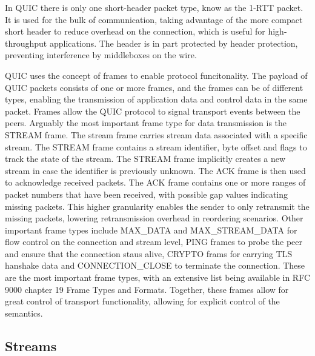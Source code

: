 \documentclass[english, 12pt, a4paper, elec, utf8, a-2b, online]{aaltothesis}
\begin{document}
In QUIC there is only one short-header packet type, know as the 1-RTT packet. It is
used for the bulk of communication, taking advantage of the more compact short
header to reduce overhead on the connection, which is useful for high-throughput
applications. The header is in part protected by header protection, preventing
interference by middleboxes on the wire.

QUIC uses the concept of frames to enable protocol funcitonality. The payload of
QUIC packets consists of one or more frames, and the frames can be of different types,
enabling the transmission of application data and control data in the same packet. Frames
allow the QUIC protocol to signal transport events between the peers. Arguably the most
important frame type for data transmission is the STREAM frame. The stream frame
carries stream data associated with a specific stream. The STREAM frame contains
a stream identifier, byte offset and flags to track the state of the stream. The STREAM
frame implicitly creates a new stream in case the identifier is previously unknown.
The ACK frame is then used to acknowledge received packets. The ACK frame contains
one or more ranges of packet numbers that have been received, with possible gap values
indicating missing packets. This higher granularity enables the sender to only retransmit
the missing packets, lowering retransmission overhead in reordering scenarios. Other
important frame types include MAX\_DATA and MAX\_STREAM\_DATA for flow control
on the connection and stream level, PING frames to probe the peer and ensure that
the connection staus alive, CRYPTO frams for carrying TLS hanshake data and CONNECTION\_CLOSE
to terminate the connection. These are the most important frame types, with an
extensive list being available in RFC 9000 chapter 19 Frame Types and Formats. Together,
these frames allow for great control of transport functionality, allowing for explicit
control of the semantics\cite{rfc9000}.

\subsection{Streams}
\end{document}

